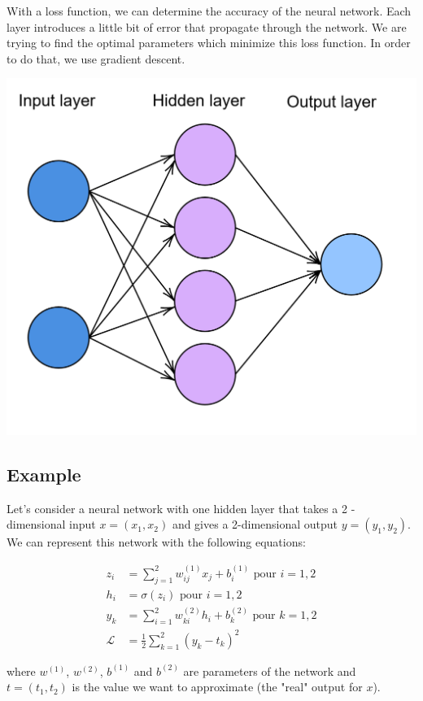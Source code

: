 \documentclass[10pt,a4paper]{article}
\theoremstyle{definition}
\theoremstyle{definition}
\theoremstyle{definition}
\begin{document}
With a loss function, we can determine the accuracy of the neural network. Each layer introduces a little bit of error that propagate through the network. We are trying to find the optimal parameters which minimize this loss function. In order to do that, we use gradient descent.

\begin{center}
\includegraphics[scale=0.2]{nn.png}
\end{center}  

\subsection{Example} \label{exnn}
Let's consider a neural network with one hidden layer that takes a 2 - dimensional input $x = (x_1, x_2)$ and gives a 2-dimensional output $y = (y_1,y_2)$. We can represent this network with the following equations:

\begin{align*}
z_i &= \sum_{j=1}^2 w_{ij}^{(1)}x_j + b_i^{(1)} \text{ pour } i = 1,2 \\ 
h_i &= \sigma (z_i) \text{ pour } i=1,2 \\
y_k &= \sum_{i=1}^2 w_{ki}^{(2)}h_i + b_k^{(2)} \text{ pour } k = 1,2 \\
\mathcal{L} &= \frac{1}{2} \sum_{k = 1}^2 (y_k - t_k)^2
\end{align*}
   
where $w^{(1)}$, $w^{(2)}$, $b^{(1)}$ and $b^{(2)}$ are parameters of the network and $t = (t_1, t_2)$ is the value we want to approximate (the "real" output for $x$). 
\end{document}
